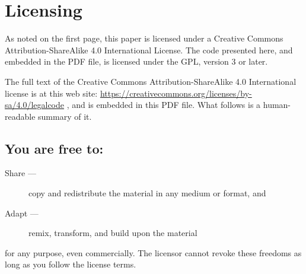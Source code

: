 \documentclass[letterpaper,twoside]{article}
\begin{document}
\section{Licensing}
\label{section:Licensing}
As noted on the first page, this paper is licensed under a Creative
Commons Attribution-ShareAlike 4.0 International License.  The code
presented here, and embedded in the PDF file, is licensed under
the GPL, version 3 or later.

The full text of the Creative Commons Attribution-ShareAlike 4.0
International license is at this web site:
\href{https://creativecommons.org/licenses/by-sa/4.0/legalcode}{https://creativecommons.org/licenses/by-sa/4.0/legalcode}%
, and is embedded in this
PDF file.  What follows is a human-readable summary of it.

\subsection{You are free to:}
\begin{description}
\item[Share ---]copy and redistribute the material in any medium or format, and
\item[Adapt ---]remix, transform, and build upon the material
\end{description}
for any purpose, even commercially.  The licensor cannot revoke these
freedoms as long as you follow the license terms.
\end{document}
